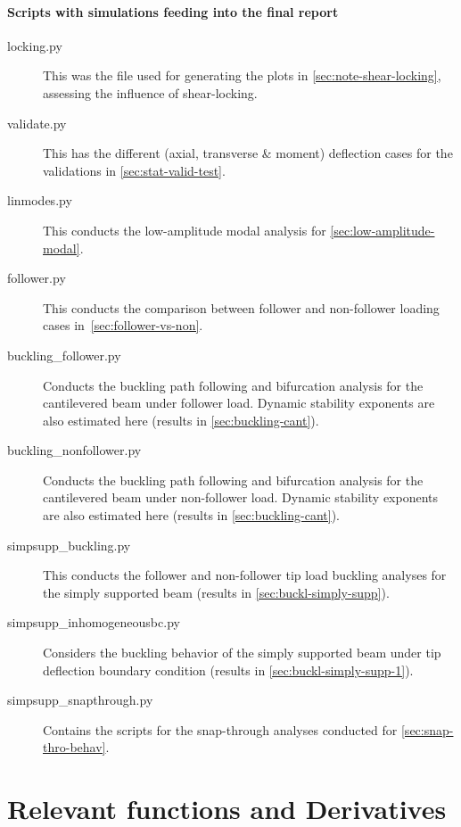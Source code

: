 \documentclass[10pt]{article}
\begin{document}
\paragraph{Scripts with simulations feeding into the final report}
\begin{description}
\item[locking.py] This was the file used for generating the plots in
  \cref{sec:note-shear-locking}, assessing the influence of
  shear-locking.
\item[validate.py] This has the different (axial, transverse \&
  moment) deflection cases for the validations in
  \cref{sec:stat-valid-test}.
\item[linmodes.py] This conducts the low-amplitude modal analysis
  for \cref{sec:low-amplitude-modal}.
\item[follower.py] This conducts the comparison between follower and
  non-follower loading cases in~\cref{sec:follower-vs-non}.
\item[buckling\_follower.py] Conducts the buckling path following and
  bifurcation analysis for the cantilevered beam under follower
  load. Dynamic stability exponents are also estimated here (results
  in \cref{sec:buckling-cant}).
\item[buckling\_nonfollower.py] Conducts the buckling path following and
  bifurcation analysis for the cantilevered beam under non-follower
  load. Dynamic stability exponents are also estimated here (results
  in \cref{sec:buckling-cant}).
\item[simpsupp\_buckling.py] This conducts the follower and
  non-follower tip load buckling analyses for the simply supported
  beam (results in \cref{sec:buckl-simply-supp}).
\item[simpsupp\_inhomogeneousbc.py] Considers the buckling behavior of
  the simply supported beam under tip deflection boundary condition
  (results in \cref{sec:buckl-simply-supp-1}).
\item[simpsupp\_snapthrough.py] Contains the scripts for the
  snap-through analyses conducted for \cref{sec:snap-thro-behav}.
\end{description}



\section{Relevant functions and Derivatives}
\label{sec:relv-funct-deriv}
\end{document}
